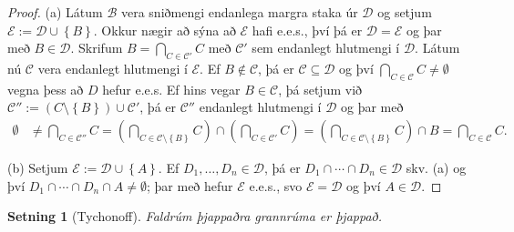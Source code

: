 \documentclass[a4paper,icelandic]{book}
\theoremstyle{definition}
\theoremstyle{plain}
\newtheorem{setn}{Setning}[section]
\theoremstyle{remark}
\begin{document}
\begin{proof}
  (a) Látum $\mathcal B$ vera sniðmengi endanlega margra staka úr
  $\mathcal D$ og setjum $\mathcal E := \mathcal D\cup\left\{ B
  \right\}$. Okkur nægir að sýna að $\mathcal E$ hafi e.e.s., því þá er
  $\mathcal D=\mathcal E$ og þar með $B\in\mathcal D$. Skrifum
  $B=\bigcap_{C\in\mathcal C'} C$ með $\mathcal C'$ sem endanlegt
  hlutmengi í $\mathcal D$. Látum nú $\mathcal C$ vera endanlegt
  hlutmengi í $\mathcal E$. Ef $B\notin \mathcal C$, þá er $\mathcal
  C\subseteq \mathcal D$ og því $\bigcap_{C\in\mathcal C}C\neq\emptyset$
  vegna þess að $D$ hefur e.e.s. Ef hins vegar $B\in\mathcal C$, þá
  setjum við $\mathcal C'':=\left( C\setminus\left\{ B \right\}
  \right)\cup \mathcal C'$, þá er $\mathcal C''$ endanlegt hlutmengi í
  $\mathcal D$ og þar með 
  \begin{align*}
    \emptyset
    &\neq \bigcap_{C\in\mathcal C''} C
    = \left( \bigcap_{C\in\mathcal C\setminus\left\{ B \right\}} C \right) 
    \cap \left(\bigcap_{C\in\mathcal C'} C\right)
    = \left( \bigcap_{C\in\mathcal C\setminus\left\{ B \right\}} C
    \right)\cap B 
    = \bigcap_{C\in\mathcal C} C.
  \end{align*}

  (b) Setjum $\mathcal E:=\mathcal D\cup\left\{ A \right\}$. Ef
  $D_1,\dots,D_n\in\mathcal D$, þá er $D_1\cap\cdots\cap D_n\in\mathcal
  D$ skv. (a) og því $D_1\cap\cdots\cap D_n\cap A\neq\emptyset$; þar
  með hefur $\mathcal E$ e.e.s., svo $\mathcal E = \mathcal D$ og því
  $A\in\mathcal D$.
\end{proof}
\begin{setn}
  [Tychonoff]\label{setn:tychonoff}
  Faldrúm þjappaðra grannrúma er þjappað.
\end{setn}
\end{document}
